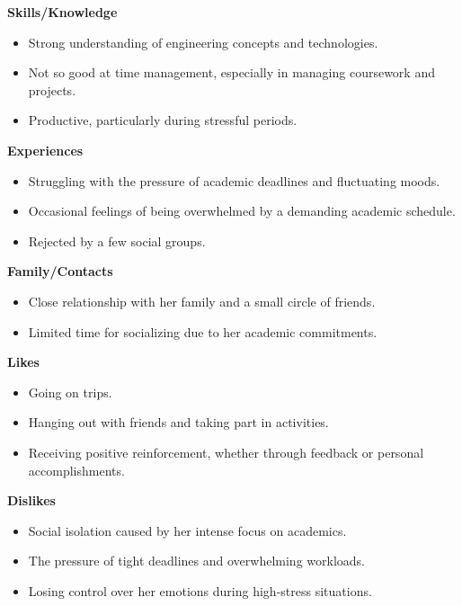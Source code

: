 \begin{center} \textbf{Skills/Knowledge} \end{center}
\begin{itemize}
    \item Strong understanding of engineering concepts and technologies.
    \item Not so good at time management, especially in managing coursework and projects.
    \item Productive, particularly during stressful periods.
\end{itemize}

\begin{center} \textbf{Experiences} \end{center}
\begin{itemize}
    \item Struggling with the pressure of academic deadlines and fluctuating moods.
    \item Occasional feelings of being overwhelmed by a demanding academic schedule.
    \item Rejected by a few social groups.
\end{itemize}

\begin{center} \textbf{Family/Contacts} \end{center}
\begin{itemize} 
    \item Close relationship with her family and a small circle of friends.
    \item Limited time for socializing due to her academic commitments.
\end{itemize}

\begin{center} \textbf{Likes} \end{center}
\begin{itemize}
    \item Going on trips.
    \item Hanging out with friends and taking part in activities.
    \item Receiving positive reinforcement, whether through feedback or personal accomplishments.
\end{itemize}

\begin{center} \textbf{Dislikes} \end{center}
\begin{itemize}
    \item Social isolation caused by her intense focus on academics.
    \item The pressure of tight deadlines and overwhelming workloads.
    \item Losing control over her emotions during high-stress situations.
\end{itemize}


